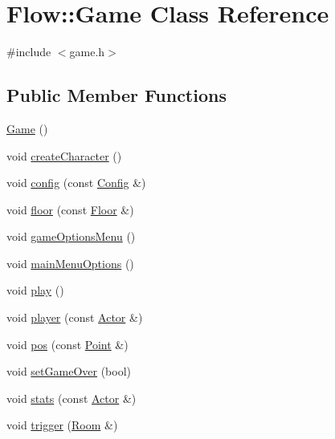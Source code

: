 \hypertarget{class_flow_1_1_game}{}\section{Flow\+:\+:Game Class Reference}
\label{class_flow_1_1_game}


{\ttfamily \#include $<$game.\+h$>$}

\subsection*{Public Member Functions}
\begin{DoxyCompactItemize}
\item 
\hyperlink{class_flow_1_1_game_a004f19f00e62d93d91eee232e29ea31c}{Game} ()
\item 
void \hyperlink{class_flow_1_1_game_a580e2eabf342b6d3ac7436797ddc888b}{create\+Character} ()
\item 
void \hyperlink{class_flow_1_1_game_af5f57d1ab3145d03cf0973b84a5334a6}{config} (const \hyperlink{struct_flow_1_1_config}{Config} \&)
\item 
void \hyperlink{class_flow_1_1_game_a00ae48e872335db0232eeb370159a3d7}{floor} (const \hyperlink{class_flow_1_1_floor}{Floor} \&)
\item 
void \hyperlink{class_flow_1_1_game_a55e2c12a46497c5d0f8bafca7f5cc808}{game\+Options\+Menu} ()
\item 
void \hyperlink{class_flow_1_1_game_a25c2d490f362ad2b0d4df53eee48602d}{main\+Menu\+Options} ()
\item 
void \hyperlink{class_flow_1_1_game_a3d95d67c58ebe09eb885b86a4d8f82ba}{play} ()
\item 
void \hyperlink{class_flow_1_1_game_a7308fddfe2757534d7012f32730ce465}{player} (const \hyperlink{class_flow_1_1_actor}{Actor} \&)
\item 
void \hyperlink{class_flow_1_1_game_a5ee9a0d6a9c1fe708deac4f5b48a01e9}{pos} (const \hyperlink{struct_flow_1_1_point}{Point} \&)
\item 
void \hyperlink{class_flow_1_1_game_a260baa4e54ff4c1862553a39052e3ee0}{set\+Game\+Over} (bool)
\item 
void \hyperlink{class_flow_1_1_game_ab97b20057d0b0952033d47b6f1b0bfe4}{stats} (const \hyperlink{class_flow_1_1_actor}{Actor} \&)
\item 
void \hyperlink{class_flow_1_1_game_aa4e29ff35123debac161f187f97aaf7d}{trigger} (\hyperlink{class_flow_1_1_room}{Room} \&)
\item 

\end{DoxyCompactItemize}
